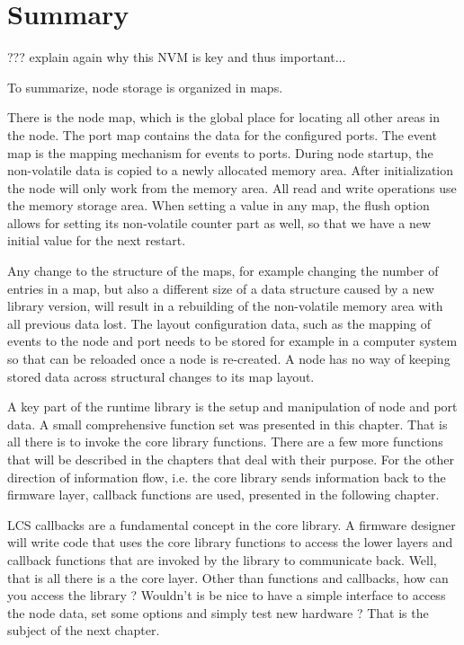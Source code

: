\section{Summary}

??? explain again why this NVM is key and thus important...

To summarize, node storage is organized in maps. 

There is the node map, which is the global place for locating all other areas in the node. The port map contains the data for the configured ports. The event map is the mapping mechanism for events to ports. During node startup, the non-volatile data is copied to a newly allocated memory area. After initialization the node will only work from the memory area. All read and write operations use the memory storage area. When setting a value in any map, the flush option allows for setting its non-volatile counter part as well, so that we have a new initial value for the next restart.

Any change to the structure of the maps, for example changing the number of entries in a map, but also a different size of a data structure caused by a new library version, will result in a rebuilding of the non-volatile memory area with all previous data lost. The layout configuration data, such as the mapping of events to the node and port needs to be stored for example in a computer system so that can be reloaded once a node is re-created. A node has no way of keeping stored data across structural changes to its map layout.

A key part of the runtime library is the setup and manipulation of node and port data. A small comprehensive function set was presented in this chapter. That is all there is to invoke the core library functions. There are a few more functions that will be described in the chapters that deal with their purpose. For the other direction of information flow, i.e. the core library sends information back to the firmware layer, callback functions are used, presented in the following chapter.

LCS callbacks are a fundamental concept in the core library. A firmware designer will write code that uses the core library functions to access the lower layers and callback functions that are invoked by the library to communicate back. Well, that is all there is a the core layer. Other than functions and callbacks, how can you access the library ? Wouldn't is be nice to have a simple interface to access the node data, set some options and simply test new hardware ? That is the subject of the next chapter.



